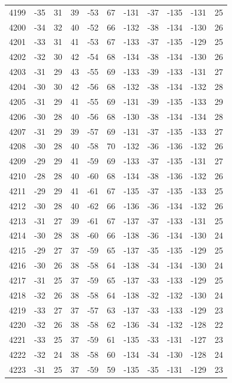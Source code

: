 \begin{table}[H]
\begin{tabular}{lllllllllll}
4199 & -35 & 31 & 39 & -53 & 67 & -131 & -37 & -135 & -131 & 25 \\
4200 & -34 & 32 & 40 & -52 & 66 & -132 & -38 & -134 & -130 & 26 \\
4201 & -33 & 31 & 41 & -53 & 67 & -133 & -37 & -135 & -129 & 25 \\
4202 & -32 & 30 & 42 & -54 & 68 & -134 & -38 & -134 & -130 & 26 \\
4203 & -31 & 29 & 43 & -55 & 69 & -133 & -39 & -133 & -131 & 27 \\
4204 & -30 & 30 & 42 & -56 & 68 & -132 & -38 & -134 & -132 & 28 \\
4205 & -31 & 29 & 41 & -55 & 69 & -131 & -39 & -135 & -133 & 29 \\
4206 & -30 & 28 & 40 & -56 & 68 & -130 & -38 & -134 & -134 & 28 \\
4207 & -31 & 29 & 39 & -57 & 69 & -131 & -37 & -135 & -133 & 27 \\
4208 & -30 & 28 & 40 & -58 & 70 & -132 & -36 & -136 & -132 & 26 \\
4209 & -29 & 29 & 41 & -59 & 69 & -133 & -37 & -135 & -131 & 27 \\
4210 & -28 & 28 & 40 & -60 & 68 & -134 & -38 & -136 & -132 & 26 \\
4211 & -29 & 29 & 41 & -61 & 67 & -135 & -37 & -135 & -133 & 25 \\
4212 & -30 & 28 & 40 & -62 & 66 & -136 & -36 & -134 & -132 & 26 \\
4213 & -31 & 27 & 39 & -61 & 67 & -137 & -37 & -133 & -131 & 25 \\
4214 & -30 & 28 & 38 & -60 & 66 & -138 & -36 & -134 & -130 & 24 \\
4215 & -29 & 27 & 37 & -59 & 65 & -137 & -35 & -135 & -129 & 25 \\
4216 & -30 & 26 & 38 & -58 & 64 & -138 & -34 & -134 & -130 & 24 \\
4217 & -31 & 25 & 37 & -59 & 65 & -137 & -33 & -133 & -129 & 25 \\
4218 & -32 & 26 & 38 & -58 & 64 & -138 & -32 & -132 & -130 & 24 \\
4219 & -33 & 27 & 37 & -57 & 63 & -137 & -33 & -133 & -129 & 23 \\
4220 & -32 & 26 & 38 & -58 & 62 & -136 & -34 & -132 & -128 & 22 \\
4221 & -33 & 25 & 37 & -59 & 61 & -135 & -33 & -131 & -127 & 23 \\
4222 & -32 & 24 & 38 & -58 & 60 & -134 & -34 & -130 & -128 & 24 \\
4223 & -31 & 25 & 37 & -59 & 59 & -135 & -35 & -131 & -129 & 23 \\

\end{tabular}
\end{table}
